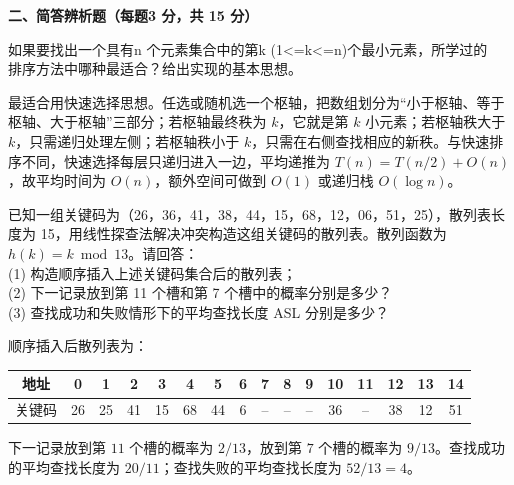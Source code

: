 \textbf{二、简答辨析题（每题3 分，共 15 分）}
\begin{question}
如果要找出一个具有n 个元素集合中的第k (1<=k<=n)个最小元素，所学过的\\
排序方法中哪种最适合？给出实现的基本思想。\\
\begin{solution}
最适合用快速选择思想。任选或随机选一个枢轴，把数组划分为“小于枢轴、等于枢轴、大于枢轴”三部分；若枢轴最终秩为 $k$，它就是第 $k$ 小元素；若枢轴秩大于 $k$，只需递归处理左侧；若枢轴秩小于 $k$，只需在右侧查找相应的新秩。与快速排序不同，快速选择每层只递归进入一边，平均递推为 $T(n)=T(n/2)+O(n)$，故平均时间为 $O(n)$，额外空间可做到 $O(1)$ 或递归栈 $O(\log n)$。
\end{solution}
\end{question}

\begin{question}
已知一组关键码为（26，36，41，38，44，15，68，12，06，51，25），散列表长度为 15，用线性探查法解决冲突构造这组关键码的散列表。散列函数为 $h(k)=k\bmod 13$。请回答：\\
(1) 构造顺序插入上述关键码集合后的散列表；\\
(2) 下一记录放到第 11 个槽和第 7 个槽中的概率分别是多少？\\
(3) 查找成功和失败情形下的平均查找长度 ASL 分别是多少？
\begin{solution}
顺序插入后散列表为：
\begin{center}
\begin{tabular}{c|ccccccccccccccc}
地址&0&1&2&3&4&5&6&7&8&9&10&11&12&13&14\\ \hline
关键码&26&25&41&15&68&44&6&--&--&--&36&--&38&12&51
\end{tabular}
\end{center}
下一记录放到第 $11$ 个槽的概率为 $2/13$，放到第 $7$ 个槽的概率为 $9/13$。查找成功的平均查找长度为 $20/11$；查找失败的平均查找长度为 $52/13=4$。
\end{solution}
\end{question}

